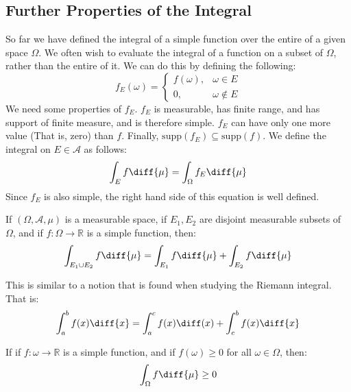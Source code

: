     \subsection{Further Properties of the Integral}
        So far we have defined the integral of a simple
        function over the entire of a given space
        $\Omega$. We often wish to evaluate the integral
        of a function on a subset of $\Omega$, rather
        than the entire of it. We can do this by defining
        the following:
        \begin{equation}
            f_{E}(\omega)=
            \begin{cases}
                f(\omega),&\omega\in{E}\\
                0,&\omega\notin{E}
            \end{cases}
        \end{equation}
        We need some properties of $f_{E}$.
        $f_{E}$ is measurable, has finite range, and
        has support of finite measure, and is therefore
        simple. $f_{E}$ can have only one more value
        (That is, zero) than $f$. Finally,
        $\mathrm{supp}(f_{E})\subseteq{\mathrm{supp}(f)}$. We define
        the integral on $E\in\mathcal{A}$ as follows:
        \begin{equation}
            \int_{E}f\diff{\mu}=
            \int_{\Omega}f_{E}\diff{\mu}
        \end{equation}
        Since $f_{E}$ is also simple, the right hand
        side of this equation is well defined.
        \begin{theorem}
            If $(\Omega,\mathcal{A},\mu)$ is a measurable
            space, if $E_{1},E_{2}$ are disjoint
            measurable subsets of $\Omega$, and if
            $f:\Omega\rightarrow\mathbb{R}$ is a simple
            function, then:
            \begin{equation}
                \int_{E_{1}\cup{E}_{2}}f\diff{\mu}=
                \int_{E_{1}}f\diff{\mu}+
                \int_{E_{2}}f\diff{\mu}
            \end{equation}
        \end{theorem}
        This is similar to a notion that is found when
        studying the Riemann integral. That is:
        \begin{equation}
            \int_{a}^{b}f(x)\diff{x}=
            \int_{a}^{c}f(x)\diff(x)+
            \int_{c}^{b}f(x)\diff{x}
        \end{equation}
        \begin{theorem}
            If if $f:\omega\rightarrow\mathbb{R}$
            is a simple function, and if
            $f(\omega)\geq{0}$ for all $\omega\in\Omega$,
            then:
            \begin{equation}
                \int_{\Omega}f\diff{\mu}\geq{0}
            \end{equation}
        \end{theorem}
